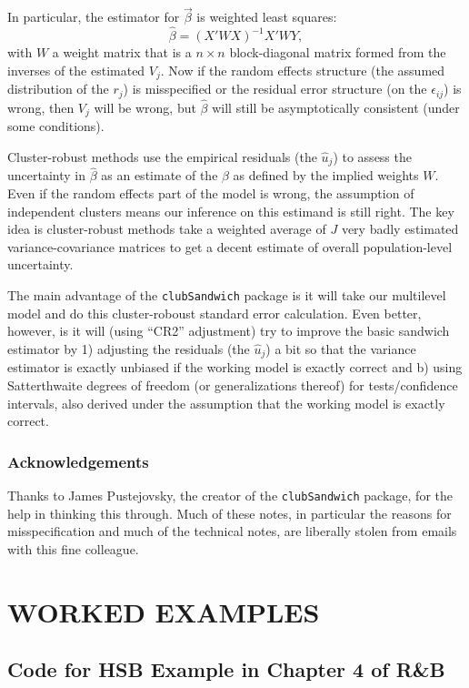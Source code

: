 \documentclass[
  letterpaper,
  DIV=11,
  numbers=noendperiod]{scrreprt}
\begin{document}
In particular, the estimator for \(\vec{\beta}\) is weighted least
squares: \[ \hat{\beta} = (X'WX)^{-1}X'W Y ,  \] with \(W\) a weight
matrix that is a \(n \times n\) block-diagonal matrix formed from the
inverses of the estimated \(V_j\). Now if the random effects structure
(the assumed distribution of the \(r_j\)) is misspecified or the
residual error structure (on the \(\epsilon_{ij}\)) is wrong, then
\(V_j\) will be wrong, but \(\hat{\beta}\) will still be asymptotically
consistent (under some conditions).

Cluster-robust methods use the empirical residuals (the \(\hat{u}_{j}\))
to assess the uncertainty in \(\hat{\beta}\) as an estimate of the
\(\beta\) as defined by the implied weights \(W\). Even if the random
effects part of the model is wrong, the assumption of independent
clusters means our inference on this estimand is still right. The key
idea is cluster-robust methods take a weighted average of \(J\) very
badly estimated variance-covariance matrices to get a decent estimate of
overall population-level uncertainty.

The main advantage of the \texttt{clubSandwich} package is it will take
our multilevel model and do this cluster-roboust standard error
calculation. Even better, however, is it will (using ``CR2'' adjustment)
try to improve the basic sandwich estimator by 1) adjusting the
residuals (the \(\hat{u}_j\)) a bit so that the variance estimator is
exactly unbiased if the working model is exactly correct and b) using
Satterthwaite degrees of freedom (or generalizations thereof) for
tests/confidence intervals, also derived under the assumption that the
working model is exactly correct.

\section{Acknowledgements}\label{acknowledgements-1}

Thanks to James Pustejovsky, the creator of the \texttt{clubSandwich}
package, for the help in thinking this through. Much of these notes, in
particular the reasons for misspecification and much of the technical
notes, are liberally stolen from emails with this fine colleague.

\part{WORKED EXAMPLES}

\chapter{Code for HSB Example in Chapter 4 of
R\&B}\label{code-for-hsb-example-in-chapter-4-of-rb}
\end{document}
